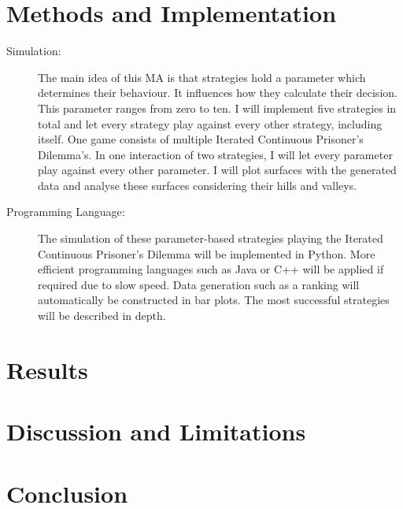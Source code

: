 \documentclass{article}
\begin{document}
\section{Methods and Implementation}

	\begin{description}
		\item[Simulation:]
			The main idea of this MA is that strategies hold a parameter which determines their behaviour. It influences how they calculate their decision. This parameter ranges from zero to ten. I will implement five strategies in total and let every strategy play against every other strategy, including itself. One game consists of multiple Iterated Continuous Prisoner's Dilemma's. In one interaction of two strategies, I will let every parameter play against every other parameter. I will plot surfaces with the generated data and analyse these surfaces considering their hills and valleys.
		\item[Programming Language:]
	The simulation of these parameter-based strategies playing the Iterated Continuous Prisoner's Dilemma will be implemented in Python. More efficient programming languages such as Java or C++ will be applied if required due to slow speed. Data generation such as a ranking will automatically be constructed in bar plots. The most successful strategies will be described in depth.
	\end{description}

\section{Results}

\section{Discussion and Limitations}

\section{Conclusion}
\end{document}
